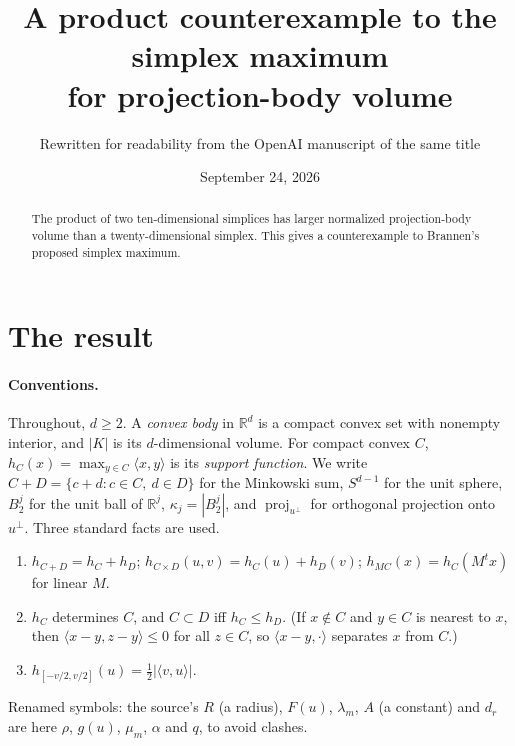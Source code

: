 \documentclass[11pt]{article}
\title{A product counterexample to the simplex maximum\\
for projection-body volume}
\author{Rewritten for readability from the OpenAI manuscript of the same title}
\date{September 24, 2026}
\newcommand{\R}{\mathbb R}
\DeclareMathOperator{\proj}{proj}
\begin{document}
\maketitle

\begin{abstract}
The product of two ten-dimensional simplices has larger normalized
projection-body volume than a twenty-dimensional simplex. This gives
a counterexample to Brannen's proposed simplex maximum.
\end{abstract}

\section{The result}

\paragraph{Conventions.}
Throughout, \(d\ge2\). A \emph{convex body} in \(\R^d\) is a compact convex set with nonempty interior, and \(|K|\) is its \(d\)-dimensional volume. For compact convex \(C\), \(h_C(x)=\max_{y\in C}\langle x,y\rangle\) is its \emph{support function}. We write \(C+D=\{c+d:c\in C,\ d\in D\}\) for the Minkowski sum, \(S^{d-1}\) for the unit sphere, \(B_2^j\) for the unit ball of \(\R^j\), \(\kappa_j=|B_2^j|\), and \(\proj_{u^\perp}\) for orthogonal projection onto \(u^\perp\). Three standard facts are used.
\begin{enumerate}[label=(S\arabic*),nosep]
\item \(h_{C+D}=h_C+h_D\); \(h_{C\times D}(u,v)=h_C(u)+h_D(v)\); \(h_{MC}(x)=h_C(M^tx)\) for linear \(M\).
\item \(h_C\) determines \(C\), and \(C\subset D\) iff \(h_C\le h_D\). (If \(x\notin C\) and \(y\in C\) is nearest to \(x\), then \(\langle x-y,z-y\rangle\le0\) for all \(z\in C\), so \(\langle x-y,\cdot\rangle\) separates \(x\) from \(C\).)
\item \(h_{[-v/2,v/2]}(u)=\tfrac12|\langle v,u\rangle|\).
\end{enumerate}
Renamed symbols: the source's \(R\) (a radius), \(F(u)\), \(\lambda_m\), \(A\) (a constant) and \(d_r\) are here \(\rho\), \(g(u)\), \(\mu_m\), \(\alpha\) and \(q\), to avoid clashes.
\end{document}

